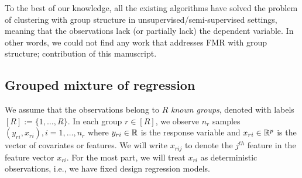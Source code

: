 \documentclass[12pt]{article}
\begin{document}
To the best of our knowledge, all the existing algorithms have solved the problem of clustering with group structure in unsupervised/semi-supervised settings, meaning that the observations lack (or partially lack) the dependent variable. In other words, we could not find any work that addresses FMR with group structure; contribution of this manuscript.
\subsection{Grouped mixture of regression}\label{sec:model}
We assume that the observations belong to $R$ \emph{known groups}, denoted with labels $[R] := \{1,\dots,R\}$. In each group $r \in [R]$, we observe $n_r$ samples $(y_{ri},x_{ri}), i=1,\dots,n_r$ where $y_{ri} \in \mathbb{R}$ is the response variable and $x_{ri} \in \mathbb{R}^p$ is the vector of covariates or features.  We will write $x_{rij}$ to denote the $j^{th}$ feature in the feature vector $x_{ri}$. For the most part, we will treat $x_{ri}$ as deterministic observations, i.e., we have fixed design regression models.
\end{document}
